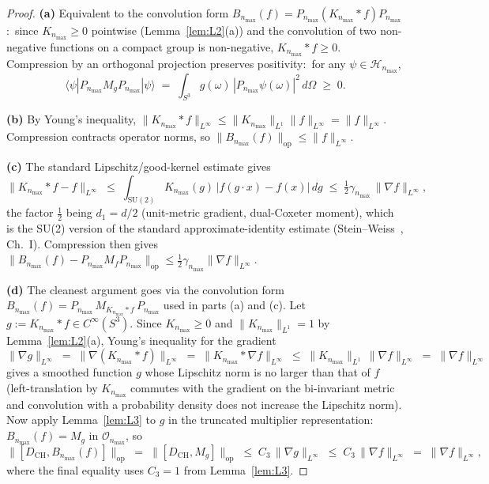 \documentclass[11pt,a4paper]{article}
\theoremstyle{plain}
\theoremstyle{definition}
\newcommand{\nmax}{n_{\max}}
\newcommand{\sthree}{S^{3}}
\newcommand{\Hilb}{\mathcal{H}}
\newcommand{\Op}{\mathcal{O}}
\newcommand{\opnorm}[1]{\lVert #1 \rVert_{\mathrm{op}}}
\newcommand{\norm}[1]{\lVert #1 \rVert}
\newcommand{\SU}{\mathrm{SU}}
\newcommand{\Mat}{M}
\newcommand{\DCH}{D_{\mathrm{CH}}}
\newcommand{\KS}{K}
\begin{document}
\begin{proof}
\textbf{(a)} Equivalent to the convolution form
$B_{\nmax}(f) = P_{\nmax} (\KS_{\nmax} * f) P_{\nmax}$:\ since
$\KS_{\nmax} \ge 0$ pointwise (Lemma~\ref{lem:L2}(a)) and the
convolution of two non-negative functions on a compact group is
non-negative, $\KS_{\nmax} * f \ge 0$. Compression by an orthogonal
projection preserves positivity:\ for any $\psi \in \Hilb_{\nmax}$,
\begin{equation*}
\langle \psi | P_{\nmax} \Mat_g P_{\nmax} | \psi \rangle
\;=\; \int_{\sthree} g(\omega)\,|P_{\nmax} \psi(\omega)|^2\,d\Omega \;\ge\; 0.
\end{equation*}

\textbf{(b)} By Young's inequality,
$\norm{\KS_{\nmax} * f}_{L^\infty} \le \norm{\KS_{\nmax}}_{L^1}
\norm{f}_{L^\infty} = \norm{f}_{L^\infty}$. Compression contracts
operator norms, so $\opnorm{B_{\nmax}(f)} \le \norm{f}_{L^\infty}$.

\textbf{(c)} The standard Lipschitz/good-kernel estimate gives
\begin{equation*}
   \norm{\KS_{\nmax} * f - f}_{L^\infty}
   \;\le\; \int_{\SU(2)} \KS_{\nmax}(g)\,|f(g \cdot x) - f(x)|\,dg
   \;\le\; \tfrac12\gamma_{\nmax}\,\norm{\nabla f}_{L^\infty},
\end{equation*}
the factor $\tfrac12$ being $d_1 = d/2$ (unit-metric gradient, dual-Coxeter
moment), which is the SU(2) version of the standard approximate-identity
estimate (Stein--Weiss~\cite{stein_weiss1971}, Ch.~I).
Compression then gives
$\opnorm{B_{\nmax}(f) - P_{\nmax} \Mat_f P_{\nmax}}
\le \tfrac12\gamma_{\nmax}\norm{\nabla f}_{L^\infty}$.

\textbf{(d)} The cleanest argument goes via the convolution form
$B_{\nmax}(f) = P_{\nmax}\,\Mat_{\KS_{\nmax} * f}\,P_{\nmax}$ used in
parts (a) and (c). Let $g := \KS_{\nmax} * f \in C^\infty(\sthree)$.
Since $\KS_{\nmax} \ge 0$ and
$\norm{\KS_{\nmax}}_{L^1} = 1$ by Lemma~\ref{lem:L2}(a), Young's
inequality for the gradient
\begin{equation}\label{eq:young_gradient}
   \norm{\nabla g}_{L^\infty}
   \;=\; \norm{\nabla(\KS_{\nmax} * f)}_{L^\infty}
   \;=\; \norm{\KS_{\nmax} * \nabla f}_{L^\infty}
   \;\le\; \norm{\KS_{\nmax}}_{L^1}\,\norm{\nabla f}_{L^\infty}
   \;=\; \norm{\nabla f}_{L^\infty}
\end{equation}
gives a smoothed function $g$ whose Lipschitz norm is no larger than
that of $f$ (left-translation by $\KS_{\nmax}$ commutes with the
gradient on the bi-invariant metric and convolution with a probability
density does not increase the Lipschitz norm). Now apply
Lemma~\ref{lem:L3} to $g$ in the truncated multiplier representation:
$B_{\nmax}(f) = \Mat_g$ in $\Op_{\nmax}$, so
\begin{equation*}
   \opnorm{[\DCH, B_{\nmax}(f)]}
   \;=\; \opnorm{[\DCH, \Mat_g]}
   \;\le\; C_3\,\norm{\nabla g}_{L^\infty}
   \;\le\; C_3\,\norm{\nabla f}_{L^\infty}
   \;=\; \norm{\nabla f}_{L^\infty},
\end{equation*}
where the final equality uses $C_3 = 1$ from Lemma~\ref{lem:L3}.
\end{proof}
\end{document}

